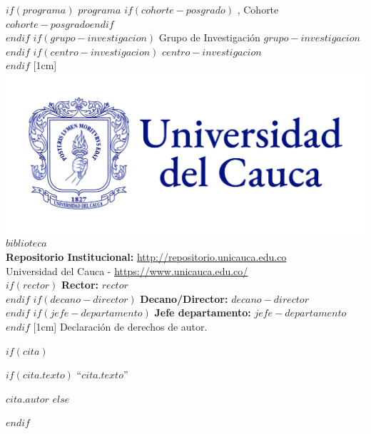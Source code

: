 \vspace{1cm}
$if(programa)$
\noindent
{$programa$ $if(cohorte-posgrado)$ {, Cohorte $cohorte-posgrado$}$endif$}\\
$endif$
$if(grupo-investigacion)$
\noindent
{Grupo de Investigación $grupo-investigacion$}\\
$endif$
$if(centro-investigacion)$
\noindent
{$centro-investigacion$}\\
$endif$
%
[1cm]
%
\includegraphics{assets/unicauca_horizontal.png}\quad
{$biblioteca$}\\[1cm]
%
{\textbf{Repositorio Institucional:} \url{http://repositorio.unicauca.edu.co}}\\[1cm]
{Universidad del Cauca - \url{https://www.unicauca.edu.co/}}\\[0.5cm]
%
$if(rector)$
{\textbf{Rector:} $rector$}\\
$endif$
$if(decano-director)$
{\textbf{Decano/Director:} $decano-director$}\\
$endif$
$if(jefe-departamento)$
{\textbf{Jefe departamento:} $jefe-departamento$}\\
$endif$
%
[1cm]
Declaración de derechos de autor.

\newpage


$if(cita)$

\thispagestyle{empty}

\vspace*{0.2\textheight}

$if(cita.texto)$
\noindent``{\itshape $cita.texto$}''\bigbreak

\hfill {$cita.autor$}
$else$

$endif$

